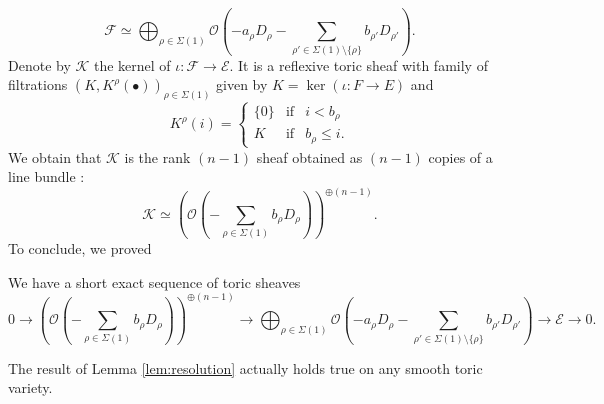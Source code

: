 \documentclass[a4paper,10pt]{amsart}
\theoremstyle{plain}{
    \newtheorem{theorem}{Theorem}[section]
    \newtheorem{lemma}[theorem]{Lemma}
    \newtheorem{corollary}[theorem]{Corollary}
    \newtheorem{proposition}[theorem]{Proposition}
    \newtheorem{conjecture}[theorem]{Conjecture}
}
\theoremstyle{definition}{
    \newtheorem{definition}[theorem]{Definition}
    \newtheorem{defn-thm}[theorem]{Definition-Theorem}
    \newtheorem{example}[theorem]{Example}
    \newtheorem{notation}[theorem]{Notation}
}
\theoremstyle{remark}{
    \newtheorem{remark}[theorem]{Remark}
    \newtheorem{problem}[theorem]{Problem}
    \newtheorem{question}[theorem]{Question}
}
\def\cF{\mathcal{F}}
\def\cE{\mathcal{E}}
\def\cO{\mathcal{O}}
\def\cK{\mathcal{K}}
\begin{document}
\begin{equation}
 \label{eq:sheaf F}
\cF\simeq \bigoplus_{\rho\in\Sigma(1)}\cO(-a_\rho D_\rho-\sum_{\rho'\in\Sigma(1)\setminus \lbrace \rho\rbrace}b_{\rho'}D_{\rho'}).
\end{equation}
Denote by $\cK$ the kernel of $\iota : \cF\to \cE$. It is a reflexive toric sheaf with family of filtrations $(K,K^\rho(\bullet))_{\rho\in\Sigma(1)}$ given by $K=\ker (\iota : F\to E)$ and
$$
K^\rho(i)=\left\{
 \begin{array}{ccc}
                  \lbrace 0 \rbrace & \mathrm{ if } & i< b_\rho \\
K & \mathrm{ if } & b_\rho\leq i .
                  \end{array}
                  \right.
$$
We obtain that $\cK$ is the rank $(n-1)$ sheaf obtained as $(n-1)$ copies of a line bundle :
\begin{equation}
 \label{eq:sheaf K}
\cK\simeq (\cO(-\sum_{\rho\in\Sigma(1)}b_\rho D_\rho))^{\oplus (n-1)}.
\end{equation}
To conclude, we proved 
\begin{lemma}
 \label{lem:resolution}
 We have a short exact sequence of toric sheaves
 $$
 0\to (\cO(-\sum_{\rho\in\Sigma(1)}b_\rho D_\rho))^{\oplus (n-1)}\to \bigoplus_{\rho\in\Sigma(1)}\cO(-a_\rho D_\rho-\sum_{\rho'\in\Sigma(1)\setminus \lbrace \rho\rbrace}b_{\rho'}D_{\rho'}) \to \cE \to 0.
 $$
\end{lemma}
\begin{remark}
 The result of Lemma \ref{lem:resolution} actually holds true on any smooth toric variety.
\end{remark}
\end{document}

